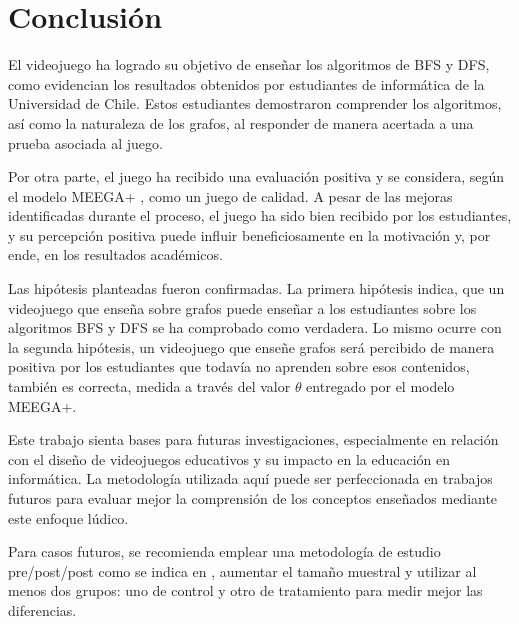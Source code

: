 \chapter{Conclusión}

El videojuego ha logrado su objetivo de enseñar los algoritmos de BFS y DFS, como evidencian los resultados obtenidos por estudiantes de informática de la Universidad de Chile. Estos estudiantes demostraron comprender los algoritmos, así como la naturaleza de los grafos, al responder de manera acertada a una prueba asociada al juego.

Por otra parte, el juego ha recibido una evaluación positiva y se considera, según el modelo MEEGA+ \cite{meegaplus}, como un juego de calidad. A pesar de las mejoras identificadas durante el proceso, el juego ha sido bien recibido por los estudiantes, y su percepción positiva puede influir beneficiosamente en la motivación y, por ende, en los resultados académicos.

Las hipótesis planteadas fueron confirmadas. La primera hipótesis indica, que un videojuego que enseña sobre grafos puede enseñar a los estudiantes sobre los algoritmos BFS y DFS se ha comprobado como verdadera. Lo mismo ocurre con la segunda hipótesis, un videojuego que enseñe grafos será percibido de manera positiva por los estudiantes que todavía no aprenden sobre esos contenidos, también es correcta, medida a través del valor $\theta$ entregado por el modelo MEEGA+.

Este trabajo sienta bases para futuras investigaciones, especialmente en relación con el diseño de videojuegos educativos y su impacto en la educación en informática. La metodología utilizada aquí puede ser perfeccionada en trabajos futuros para evaluar mejor la comprensión de los conceptos enseñados mediante este enfoque lúdico.

Para casos futuros, se recomienda emplear una metodología de estudio pre/post/post como se indica en \cite{HowGamesComputingEducationEvaluated}, aumentar el tamaño muestral y utilizar al menos dos grupos: uno de control y otro de tratamiento para medir mejor las diferencias. 




